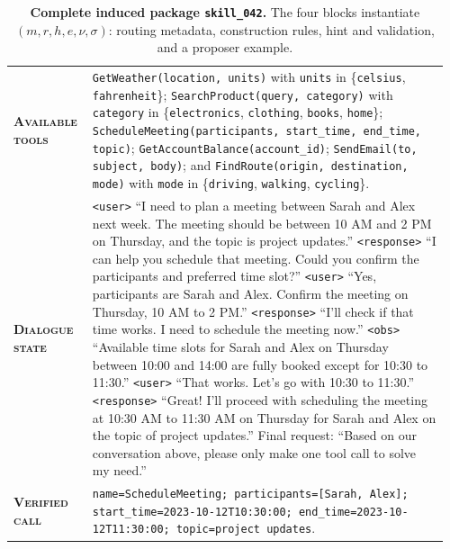 \begin{table}[htbp]
\centering
\begin{minipage}{0.97\textwidth}
\raggedright
\small
\setlength{\tabcolsep}{3pt}
\renewcommand{\arraystretch}{1.16}
\vspace{0.35em}
\begin{tabular}{@{}>{\raggedright\arraybackslash\bfseries}p{0.17\linewidth} >{\raggedright\arraybackslash}p{0.79\linewidth}@{}}
    \textsc{Available tools} & \texttt{GetWeather(location, units)} with \texttt{units} in \{\texttt{celsius}, \texttt{fahrenheit}\}; \texttt{SearchProduct(query, category)} with \texttt{category} in \{\texttt{electronics}, \texttt{clothing}, \texttt{books}, \texttt{home}\}; \texttt{ScheduleMeeting(participants, start\_time, end\_time, topic)}; \texttt{GetAccountBalance(account\_id)}; \texttt{SendEmail(to, subject, body)}; and \texttt{FindRoute(origin, destination, mode)} with \texttt{mode} in \{\texttt{driving}, \texttt{walking}, \texttt{cycling}\}. \\
    \textsc{Dialogue state} & \texttt{<user>} ``I need to plan a meeting between Sarah and Alex next week. The meeting should be between 10 AM and 2 PM on Thursday, and the topic is project updates.'' \texttt{<response>} ``I can help you schedule that meeting. Could you confirm the participants and preferred time slot?'' \texttt{<user>} ``Yes, participants are Sarah and Alex. Confirm the meeting on Thursday, 10 AM to 2 PM.'' \texttt{<response>} ``I'll check if that time works. I need to schedule the meeting now.'' \texttt{<obs>} ``Available time slots for Sarah and Alex on Thursday between 10:00 and 14:00 are fully booked except for 10:30 to 11:30.'' \texttt{<user>} ``That works. Let's go with 10:30 to 11:30.'' \texttt{<response>} ``Great! I'll proceed with scheduling the meeting at 10:30 AM to 11:30 AM on Thursday for Sarah and Alex on the topic of project updates.'' Final request: ``Based on our conversation above, please only make one tool call to solve my need.'' \\
    \textsc{Verified call} & \texttt{name=ScheduleMeeting; participants=[Sarah, Alex]; start\_time=2023-10-12T10:30:00; end\_time=2023-10-12T11:30:00; topic=project updates}. \\
\end{tabular}
\vspace{0.45em}
\end{minipage}
\caption{\textbf{Complete induced package \texttt{skill\_042}.} The four blocks instantiate $(m,r,h,e,\nu,\sigma)$: routing metadata, construction rules, hint and validation, and a proposer example.}
\label{tab:complete_toolcall_skill_timeslot}
\end{table}

